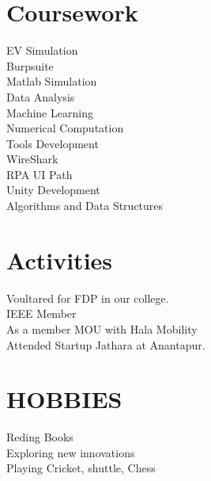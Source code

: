\documentclass[]{deedy-resume-openfont}
\begin{document}
\begin{minipage}[t]{0.33\textwidth}


\section{Coursework}
EV Simulation \\
Burpsuite \\
Matlab Simulation \\

Data Analysis \\
Machine Learning \\
Numerical Computation \\
Tools Development \\
WireShark \\
RPA UI Path\\
Unity Development\\
Algorithms and Data Structures


\section{Activities}
Voultared for FDP in our college. \\
IEEE Member \\
As a member MOU with Hala Mobility \\
Attended Startup Jathara at Anantapur. \\
\section{HOBBIES}
Reding Books\\
Exploring new innovations\\
Playing Cricket, shuttle, Chess\\


\end{minipage}%
\end{document}

